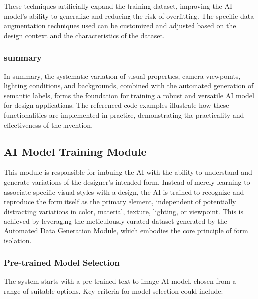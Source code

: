 \documentclass{article}
\begin{document}
These techniques artificially expand the training dataset, improving the AI model's ability to generalize and reducing the risk of overfitting. The specific data augmentation techniques used can be customized and adjusted based on the design context and the characteristics of the dataset.

\subsubsection{summary}

In summary, the systematic variation of visual properties, camera viewpoints, lighting conditions, and backgrounds, combined with the automated generation of semantic labels, forms the foundation for training a robust and versatile AI model for design applications. The referenced code examples illustrate how these functionalities are implemented in practice, demonstrating the practicality and effectiveness of the invention.

\subsection{AI Model Training Module}





This module is responsible for imbuing the AI with the ability to understand and generate variations of the designer's intended form. Instead of merely learning to associate specific visual styles with a design, the AI is trained to recognize and reproduce the form itself as the primary element, independent of potentially distracting variations in color, material, texture, lighting, or viewpoint. This is achieved by leveraging the meticulously curated dataset generated by the Automated Data Generation Module, which embodies the core principle of form isolation.

\subsubsection{Pre-trained Model Selection}
The system starts with a pre-trained text-to-image AI model, chosen from a range of suitable options. Key criteria for model selection could include:
\end{document}
